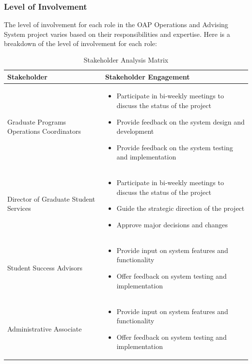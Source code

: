 \documentclass[12pt]{article}
\begin{document}
\subsubsection{Level of Involvement}
The level of involvement for each role in the OAP Operations and Advising System project varies based on their responsibilities and expertise. Here is a breakdown of the level of involvement for each role:

\begin{table}[ht]
    \centering
    \caption{Stakeholder Analysis Matrix}
    \label{tab: stakeholder-analysis-matrix}
    \setlength{\leftmargini}{0.4cm}
    \begin{tabular}{| m{8.5cm} | m{7cm} |}
        \hline
        \textbf{Stakeholder} & \textbf{Stakeholder Engagement}\\
        \hline
        Graduate Programs Operations Coordinators &
        \begin{itemize}
            \item Participate in bi-weekly meetings to discuss the status of the project
            \item Provide feedback on the system design and development
            \item Provide feedback on the system testing and implementation
        \end{itemize}
        \\
        \hline
        Director of Graduate Student Services &
        \begin{itemize}
            \item Participate in bi-weekly meetings to discuss the status of the project
            \item Guide the strategic direction of the project
            \item Approve major decisions and changes
        \end{itemize}
        \\
        \hline
        Student Success Advisors &
        \begin{itemize}
            \item Provide input on system features and functionality
            \item Offer feedback on system testing and implementation
        \end{itemize}
        \\
        \hline
        Administrative Associate &
        \begin{itemize}
            \item Provide input on system features and functionality
            \item Offer feedback on system testing and implementation
        \end{itemize}
        \\
        \hline
    \end{tabular}
\end{table}
\end{document}
